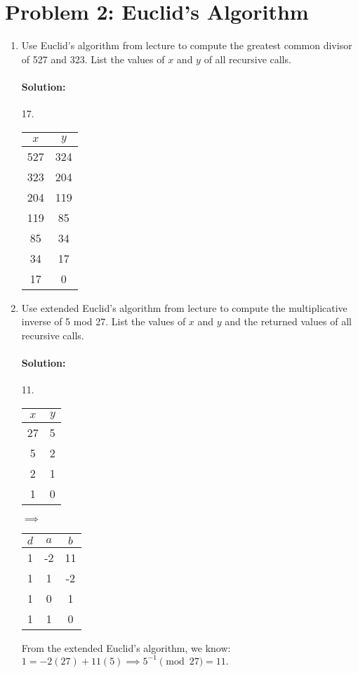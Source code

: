 \documentclass[11pt, notitlepage]{report}
\newcommand{\Question}[1]{\newpage\section{#1}}
\newenvironment{solution}{\paragraph{Solution:}}{\hfill}
\begin{document}
\Question{Problem 2: Euclid's Algorithm}

\begin{enumerate}[label=(\alph*)]
    \item Use Euclid's algorithm from lecture to compute the greatest common divisor of 527 and 323. List the values of $x$ and $y$ of all recursive calls.
	\begin{solution} 17.
	\begin{center}
		\begin{tabular}{c|c}
		  $x$&$y$ \\
		  \hline
		  527&324 \\
		  323&204 \\
		  204&119 \\
		  119&85 \\
		  85&34 \\
		  34&17 \\
		  17&0
		\end{tabular}
	\end{center}

	\end{solution}
    \item Use extended Euclid's algorithm from lecture to compute the multiplicative inverse of 5 mod 27. List the values of $x$ and $y$ and the returned values of all recursive calls.
	\begin{solution} 11.
	\begin{center}
		\begin{tabular}{c|c}
		  $x$&$y$ \\
		  \hline
		  27&5 \\
		  5&2 \\
		  2&1 \\
		  1&0 \\
		\end{tabular}$\implies$
		\begin{tabular}{c|c|c}
		  $d$&$a$&$b$ \\
		  \hline
		  1&-2&11 \\
		  1&1&-2 \\
		  1&0&1 \\
		  1&1&0
		\end{tabular}
	\end{center}
	From the extended Euclid's algorithm, we know: $1=-2(27) + 11(5) \implies 5^{-1} \pmod{27}=11.$

	\end{solution}


\end{enumerate}
\end{document}
